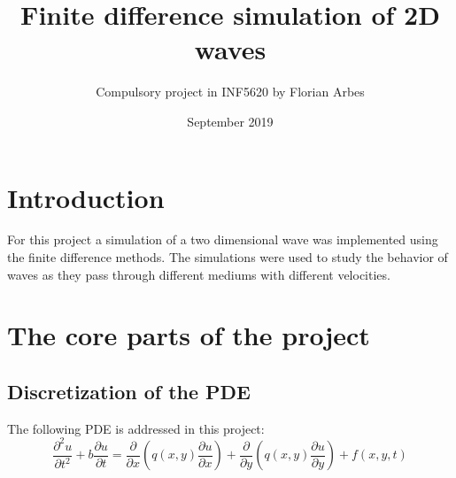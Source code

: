 \documentclass{report}
\title{Finite difference simulation of 2D waves}
\author{Compulsory project in INF5620 by Florian Arbes}
\date{September 2019}
\begin{document}
\maketitle

    \chapter*{Introduction}
        For this project a simulation of a two dimensional wave was implemented using the finite difference methods. The simulations were used to study the behavior of waves as they pass through different mediums with different velocities. 
        
        
    \chapter*{The core parts of the project}
    
    \section*{Discretization of the PDE}
    
        The following PDE is addressed in this project:
        \begin{equation} \label{eq:1}
            \frac{\partial^2 u}{\partial t^2} + b\frac{\partial u}{\partial t} = \frac{\partial}{\partial x}(q(x, y)\frac{\partial u}{\partial x}) + \frac{\partial}{\partial y}(q(x, y)\frac{\partial u}{\partial y}) + f(x, y, t)
        \end{equation}
        
\end{document}
